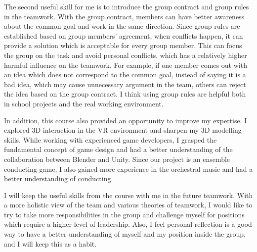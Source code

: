 The second useful skill for me is to introduce the group contract and group rules in the teamwork. With the group contract, members can have better awareness about the common goal and work in the same direction. Since group rules are established based on group members’ agreement, when conflicts happen, it can provide a solution which is acceptable for every group member. This can focus the group on the task and avoid personal conflicts, which has a relatively higher harmful influence on the teamwork. For example, if one member comes out with an idea which does not correspond to the common goal, instead of saying it is a bad idea, which may cause unnecessary argument in the team, others can reject the idea based on the group contract. I think using group rules are helpful both in school projects and the real working environment.

In addition, this course also provided an opportunity to improve my expertise. I explored 3D interaction in the VR environment and sharpen my 3D modelling skills. While working with experienced game developers, I grasped the fundamental concept of game design and had a better understanding of the collaboration between Blender and Unity. Since our project is an ensemble conducting game, I also gained more experience in the orchestral music and had a better understanding of conducting.

I will keep the useful skills from the course with me in the future teamwork. With a more holistic view of the team and various theories of teamwork, I would like to try to take more responsibilities in the group and challenge myself for positions which require a higher level of leadership. Also, I feel personal reflection is a good way to have a better understanding of myself and my position inside the group, and I will keep this as a habit. 
 